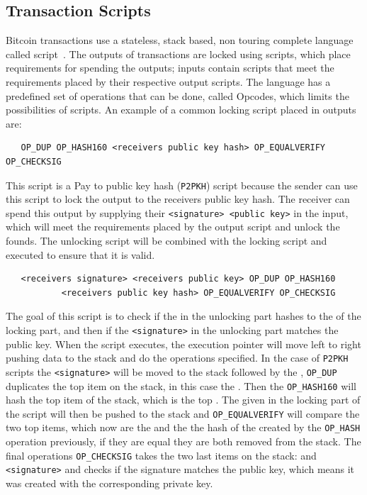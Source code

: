 \subsection{Transaction Scripts}
\label{subsec:scripts}

Bitcoin transactions use a stateless, stack based, non touring complete language called script~\cite{antonopoulos2017mastering}.
The outputs of transactions are locked using scripts, which place requirements for spending the outputs; inputs contain scripts that meet the requirements placed by their respective output scripts. The language has a predefined set of operations that can be done, called Opcodes, which limits the possibilities of scripts. 
An example of a common locking script placed in outputs are: 

\begin{verbatim}
   OP_DUP OP_HASH160 <receivers public key hash> OP_EQUALVERIFY OP_CHECKSIG
\end{verbatim}


This script is a Pay to public key hash ({\tt P2PKH}) script because the sender can use this script to lock the output to the receivers public key hash. The receiver can spend this output by supplying their {\tt<signature> <public key>} in the input, which will meet the requirements placed by the output script and unlock the founds. The unlocking script will be combined with the locking script and executed to ensure that it is valid. 

\begin{verbatim}
   <receivers signature> <receivers public key> OP_DUP OP_HASH160 
           <receivers public key hash> OP_EQUALVERIFY OP_CHECKSIG
\end{verbatim}

The goal of this script is to check if the {\tt <public key>} in the unlocking part hashes to the {\tt  <public key hash>} of the locking part, and then if the {\tt <signature>} in the unlocking part matches the public key.
When the script executes, the execution pointer will move left to right pushing data to the stack and do the operations specified.
In the case of {\tt P2PKH} scripts the {\tt <signature>} will be moved to the stack followed by the {\tt <public key>}, {\tt OP\_DUP} duplicates the top item on the stack, in this case the {\tt <public key>}. Then the {\tt OP\_HASH160} will hash the top item of the stack, which is the top {\tt <public key>}. The {\tt <public key hash>} given in the locking part of the script will then be pushed to the stack and {\tt OP\_EQUALVERIFY} will compare the two top items, which now are the {\tt <public key hash>} and the the hash of the {\tt <public key>} created by the {\tt OP\_HASH} operation previously, if they are equal they are both removed from the stack. The final operations {\tt OP\_CHECKSIG} takes the two last items on the stack: {\tt <public key>} and {\tt <signature>} and checks if the signature matches the public key, which means it was created with the corresponding private key.
\\

